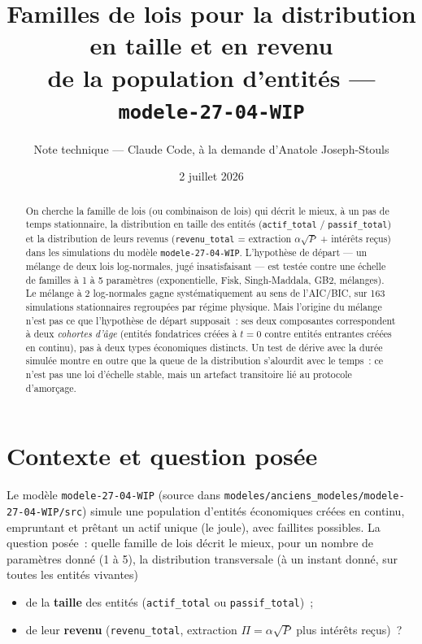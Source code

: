 \documentclass[11pt,a4paper]{article}
\title{Familles de lois pour la distribution en taille et en revenu\\
de la population d'entités --- \texttt{modele-27-04-WIP}}
\author{Note technique --- Claude Code, à la demande d'Anatole Joseph-Stouls}
\date{2 juillet 2026}
\begin{document}
\maketitle

\begin{abstract}
On cherche la famille de lois (ou combinaison de lois) qui décrit le mieux, à
un pas de temps stationnaire, la distribution en taille des entités
(\texttt{actif\_total} / \texttt{passif\_total}) et la distribution de leurs
revenus (\texttt{revenu\_total} = extraction $\alpha\sqrt{P}$ + intérêts
reçus) dans les simulations du modèle \texttt{modele-27-04-WIP}. L'hypothèse
de départ --- un mélange de deux lois log-normales, jugé insatisfaisant ---
est testée contre une échelle de familles à 1 à 5 paramètres (exponentielle,
Fisk, Singh-Maddala, GB2, mélanges). Le mélange à 2 log-normales gagne
systématiquement au sens de l'AIC/BIC, sur 163 simulations stationnaires
regroupées par régime physique. Mais l'origine du mélange n'est pas ce que
l'hypothèse de départ supposait~: ses deux composantes correspondent à deux
\emph{cohortes d'âge} (entités fondatrices créées à $t=0$ contre entités
entrantes créées en continu), pas à deux types économiques distincts. Un
test de dérive avec la durée simulée montre en outre que la queue de la
distribution s'alourdit avec le temps~: ce n'est pas une loi d'échelle
stable, mais un artefact transitoire lié au protocole d'amorçage.
\end{abstract}

\tableofcontents

\section{Contexte et question posée}

Le modèle \texttt{modele-27-04-WIP} (source dans
\texttt{modeles/anciens_modeles/modele-27-04-WIP/src}) simule une population d'entités économiques
créées en continu, empruntant et prêtant un actif unique (le joule), avec
faillites possibles. La question posée~: quelle famille de lois décrit le
mieux, pour un nombre de paramètres donné (1 à 5), la distribution
transversale (à un instant donné, sur toutes les entités vivantes)
\begin{itemize}
  \item de la \textbf{taille} des entités (\texttt{actif\_total} ou
  \texttt{passif\_total})~;
  \item de leur \textbf{revenu} (\texttt{revenu\_total}, extraction
  $\Pi = \alpha\sqrt{P}$ plus intérêts reçus)~?
\end{itemize}
\end{document}
